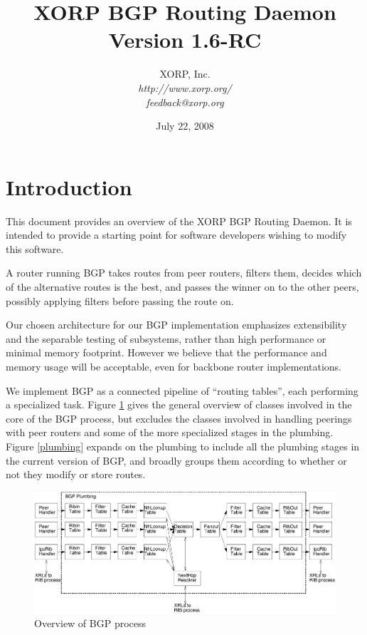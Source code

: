 \documentclass[11pt]{article}
\begin{document}
\title{XORP BGP Routing Daemon \\
\vspace{1ex}
Version 1.6-RC}
\author{ XORP, Inc.					\\
         {\it http://www.xorp.org/}			\\
	 {\it feedback@xorp.org}
}
\date{July 22, 2008}

\maketitle


\section{Introduction}

This document provides an overview of the XORP BGP Routing Daemon.  It
is intended to provide a starting point for software developers
wishing to modify this software.

A router running BGP takes routes from peer routers, filters them,
decides which of the alternative routes is the best, and passes the
winner on to the other peers, possibly applying filters before passing
the route on.

Our chosen architecture for our BGP implementation emphasizes
extensibility and the separable testing of subsystems, rather than
high performance or minimal memory footprint.  However we believe that
the performance and memory usage will be acceptable, even for backbone
router implementations.

We implement BGP as a connected pipeline of ``routing tables'', each
performing a specialized task.  Figure \ref{overview} gives the
general overview of classes involved in the core of the BGP process,
but excludes the classes involved in handling peerings with peer
routers and some of the more specialized stages in the plumbing.
Figure \ref{plumbing} expands on the plumbing to include all the
plumbing stages in the current version of BGP, and broadly groups them
according to whether or not they modify or store routes.

\begin{figure}[htb]
\centerline{\includegraphics[width=1.0\textwidth]{figs/overview}}
\vspace{.05in}
\caption{\label{overview}Overview of BGP process}
\end{figure}
\end{document}
